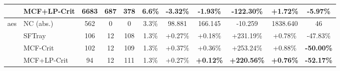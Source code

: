 \begin{table}[t]
{\begin{tabular}{ll|cccc|ccc|cc}
 & MCF+LP-Crit & 6683 & 687 & 378 & 6.6\% & \textbf{-3.32\%} & \textbf{-1.93\%} & \textbf{-122.30\%} & +1.72\% & \textbf{-5.97\%} \\
\midrule
\multirow{4}{*}{aes} & NC (abs.) & 562 & 0 & 0 & 3.3\% & 98.881 & 166.145 & -10.259 & 1838.640 & 46 \\
 & SFTray & 106 & 12 & 108 & 1.3\% & +0.27\% & +0.18\% & +231.19\% & +0.78\% & -47.83\% \\
 & MCF-Crit & 102 & 12 & 109 & 1.3\% & +0.37\% & +0.36\% & +253.24\% & +0.88\% & \textbf{-50.00\%} \\
 & MCF+LP-Crit & 94 & 12 & 111 & 1.3\% & +0.27\% & \textbf{+0.12\%} & \textbf{+220.56\%} & \textbf{+0.76\%} & \textbf{-52.17\%} \\
\midrule
\bottomrule
\end{tabular}
}
\end{table}